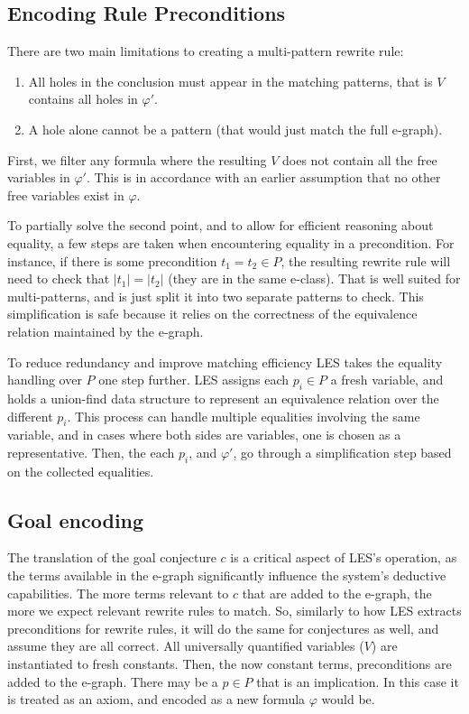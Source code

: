 \subsection{Encoding Rule Preconditions}
\label{translation:les:conditions}

There are two main limitations to creating a multi-pattern rewrite rule:
\begin{enumerate}
    \item All holes in the conclusion must appear in the matching patterns, that is $V$ contains all holes in $\varphi'$.
    \item A hole alone cannot be a pattern (that would just match the full e-graph).
\end{enumerate}

First, we filter any formula where the resulting $V$ does not contain all the free variables in $\varphi'$.
This is in accordance with an earlier assumption that no other free variables exist in $\varphi$.

To partially solve the second point, and to allow for efficient reasoning about equality, a few steps are taken when encountering equality in a precondition.
For instance, if there is some precondition $t_1 = t_2 \in P$, the resulting rewrite rule will need to check that $|t_1| = |t_2|$ (they are in the same e-class).
That is well suited for multi-patterns, and is just split it into two separate patterns to check.
This simplification is safe because it relies on the correctness of the equivalence relation maintained by the e-graph.

To reduce redundancy and improve matching efficiency LES takes the equality handling over $P$ one step further.
LES assigns each $p_i \in P$ a fresh variable, and holds a union-find data structure to represent an equivalence relation over the different $p_i$.
This process can handle multiple equalities involving the same variable, and in cases where both sides are variables, one is chosen as a representative.
Then, the each $p_i$, and $\varphi'$, go through a simplification step based on the collected equalities.

\subsection{Goal encoding}
\label{translation:les:goal}

The translation of the goal conjecture $c$ is a critical aspect of LES's operation, as the terms available in the e-graph significantly influence the system's deductive capabilities.
The more terms relevant to $c$ that are added to the e-graph, the more we expect relevant rewrite rules to match.
So, similarly to how LES extracts preconditions for rewrite rules, it will do the same for conjectures as well, and assume they are all correct.
All universally quantified variables ($V$) are instantiated to fresh constants.
Then, the now constant terms, preconditions are added to the e-graph.
There may be a $p \in P$ that is an implication.
In this case it is treated as an axiom, and encoded as a new formula $\varphi$ would be.

